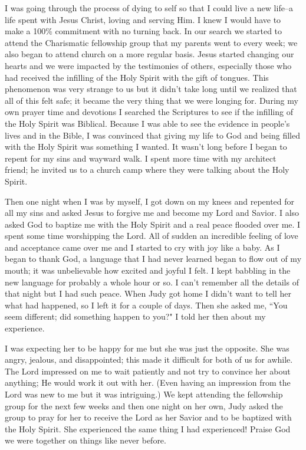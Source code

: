 \documentclass[oneside]{book}
\begin{document}
I was going through the process of dying to self so that I could live a new life--a life spent with Jesus Christ, loving and serving Him. I knew I would have to make a 100\% commitment with no turning back. In our search we started to attend the Charismatic fellowship group that my parents went to every week; we also began to attend church on a more regular basis. Jesus started changing our hearts and we were impacted by the testimonies of others, especially those who had received the infilling of the Holy Spirit with the gift of tongues. This phenomenon was very strange to us but it didn't take long until we realized that all of this felt safe; it became the very thing that we were longing for. During my own prayer time and devotions I searched the Scriptures to see if the infilling of the Holy Spirit was Biblical. Because I was able to see the evidence in people's lives and in the Bible, I was convinced that giving my life to God and being filled with the Holy Spirit was something I wanted. It wasn't long before I began to repent for my sins and wayward walk. I spent more time with my architect friend; he invited us to a church camp where they were talking about the Holy Spirit. 

Then one night when I was by myself, I got down on my knees and repented for all my sins and asked Jesus to forgive me and become my Lord and Savior. I also asked God to baptize me with the Holy Spirit and a real peace flooded over me. I spent some time worshipping the Lord. All of sudden an incredible feeling of love and acceptance came over me and I started to cry with joy like a baby. As I began to thank God, a language that I had never learned began to flow out of my mouth; it was unbelievable how excited and joyful I felt. I kept babbling in the new language for probably a whole hour or so. I can't remember all the details of that night but I had such peace. When Judy got home I didn't want to tell her what had happened, so I left it for a couple of days. Then she asked me, ``You seem different; did something happen to you?" I told her then about my experience. 

I was expecting her to be happy for me but she was just the opposite. She was angry, jealous, and disappointed; this made it difficult for both of us for awhile. The Lord impressed on me to wait patiently and not try to convince her about anything; He would work it out with her. (Even having an impression from the Lord was new to me but it was intriguing.) We kept attending the fellowship group for the next few weeks and then one night on her own, Judy asked the group to pray for her to receive the Lord as her Savior and to be baptized with the Holy Spirit. She experienced the same thing I had experienced! Praise God we were together on things like never before. 
\end{document}
